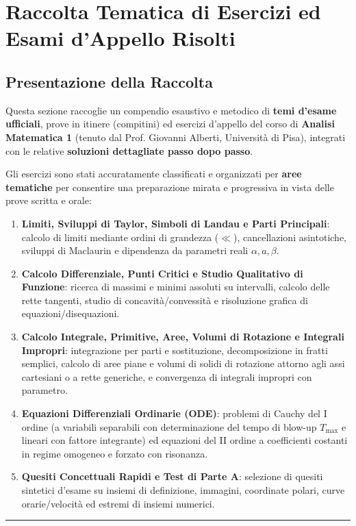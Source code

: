 \chapter{Raccolta Tematica di Esercizi ed Esami d'Appello Risolti}
\label{chap:raccolta_esami}

\section*{Presentazione della Raccolta}
Questa sezione raccoglie un compendio esaustivo e metodico di \textbf{temi d'esame ufficiali}, prove in itinere (compitini) ed esercizi d'appello del corso di \textbf{Analisi Matematica 1} (tenuto dal Prof. Giovanni Alberti, Università di Pisa), integrati con le relative \textbf{soluzioni dettagliate passo dopo passo}.

Gli esercizi sono stati accuratamente classificati e organizzati per \textbf{aree tematiche} per consentire una preparazione mirata e progressiva in vista delle prove scritta e orale:

\begin{enumerate}[label=\textbf{\Roman*.}]
    \item \textbf{Limiti, Sviluppi di Taylor, Simboli di Landau e Parti Principali}: calcolo di limiti mediante ordini di grandezza ($\ll$), cancellazioni asintotiche, sviluppi di Maclaurin e dipendenza da parametri reali $\alpha, a, \beta$.
    \item \textbf{Calcolo Differenziale, Punti Critici e Studio Qualitativo di Funzione}: ricerca di massimi e minimi assoluti su intervalli, calcolo delle rette tangenti, studio di concavità/convessità e risoluzione grafica di equazioni/disequazioni.
    \item \textbf{Calcolo Integrale, Primitive, Aree, Volumi di Rotazione e Integrali Impropri}: integrazione per parti e sostituzione, decomposizione in fratti semplici, calcolo di aree piane e volumi di solidi di rotazione attorno agli assi cartesiani o a rette generiche, e convergenza di integrali impropri con parametro.
    \item \textbf{Equazioni Differenziali Ordinarie (ODE)}: problemi di Cauchy del I ordine (a variabili separabili con determinazione del tempo di blow-up $T_{\text{max}}$ e lineari con fattore integrante) ed equazioni del II ordine a coefficienti costanti in regime omogeneo e forzato con risonanza.
    \item \textbf{Quesiti Concettuali Rapidi e Test di Parte A}: selezione di quesiti sintetici d'esame su insiemi di definizione, immagini, coordinate polari, curve orarie/velocità ed estremi di insiemi numerici.
\end{enumerate}

\vspace{1em}
\hrule
\vspace{1.5em}







